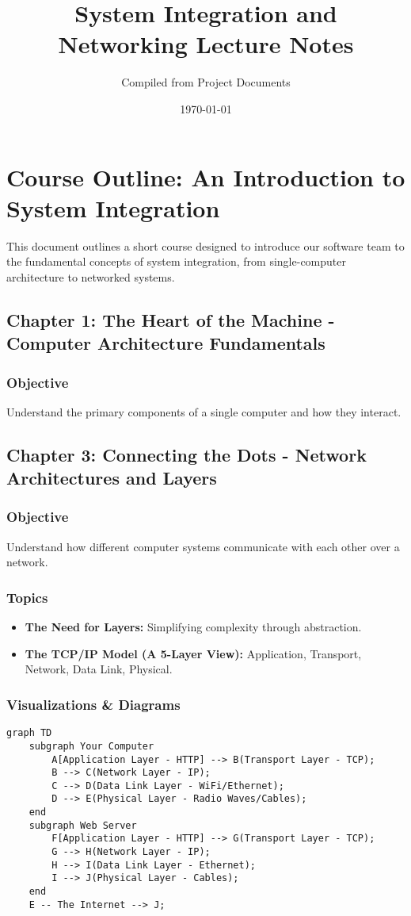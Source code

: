 \documentclass{article}
\title{System Integration and Networking Lecture Notes}
\author{Compiled from Project Documents}
\date{\today}
\begin{document}
\maketitle
\tableofcontents
\newpage

\section{Course Outline: An Introduction to System Integration}
This document outlines a short course designed to introduce our software team to the fundamental concepts of system integration, from single-computer architecture to networked systems.

\subsection{Chapter 1: The Heart of the Machine - Computer Architecture Fundamentals}
\subsubsection{Objective}
Understand the primary components of a single computer and how they interact.



\subsection{Chapter 3: Connecting the Dots - Network Architectures and Layers}
\subsubsection{Objective}
Understand how different computer systems communicate with each other over a network.

\subsubsection{Topics}
\begin{itemize}
    \item \textbf{The Need for Layers:} Simplifying complexity through abstraction.
    \item \textbf{The TCP/IP Model (A 5-Layer View):} Application, Transport, Network, Data Link, Physical.
\end{itemize}

\subsubsection{Visualizations \& Diagrams}
\begin{verbatim}
graph TD
    subgraph Your Computer
        A[Application Layer - HTTP] --> B(Transport Layer - TCP);
        B --> C(Network Layer - IP);
        C --> D(Data Link Layer - WiFi/Ethernet);
        D --> E(Physical Layer - Radio Waves/Cables);
    end
    subgraph Web Server
        F[Application Layer - HTTP] --> G(Transport Layer - TCP);
        G --> H(Network Layer - IP);
        H --> I(Data Link Layer - Ethernet);
        I --> J(Physical Layer - Cables);
    end
    E -- The Internet --> J;
\end{verbatim}
\end{document}
